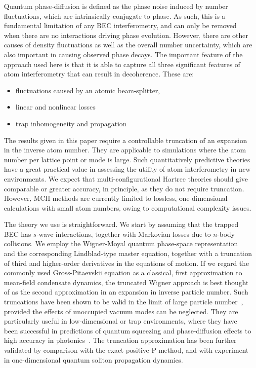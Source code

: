 \documentclass[aps,prl,twocolumn,showpacs,amsmath,amssymb,superscriptaddress]{revtex4-1}
\begin{document}
Quantum phase-diffusion is defined as the phase noise induced by number fluctuations,
which are intrinsically conjugate to phase.
As such, this is a fundamental limitation of any BEC interferometry,
and can only be removed when there are no interactions driving phase evolution.
However, there are other causes of density fluctuations as well as the overall number uncertainty,
which are also important in causing observed phase decays.
The important feature of the approach used here is that it is able to capture
all three significant features of atom interferometry that can result in decoherence.
These are:
\begin{itemize}
\item fluctuations caused by an atomic beam-splitter,
\item linear and nonlinear losses
\item trap inhomogeneity and propagation
\end{itemize}
The results given in this paper require a controllable truncation
of an expansion in the inverse atom number.
They are applicable to simulations where the atom number per lattice point or mode is large.
Such quantitatively predictive theories have a great practical value
in assessing the utility of atom interferometry in new environments.
We expect that multi-configurational Hartree theories should give comparable or greater accuracy,
in principle, as they do not require truncation.
However, MCH methods are currently limited to lossless,
one-dimensional calculations with small atom numbers,
owing to computational complexity issues.

The theory we use is straightforward.
We start by assuming that the trapped BEC has $s$-wave interactions,
together with Markovian losses due to $n$-body collisions.
We employ the Wigner-Moyal quantum phase-space representation~\cite{Gardiner2004}
and the corresponding Lindblad-type master equation,
together with a truncation of third and higher-order derivatives in the equations of motion.
If we regard the commonly used Gross-Pitaevskii equation as a classical,
first approximation to mean-field condensate dynamics,
the truncated Wigner approach is best thought of as the second approximation
in an expansion in inverse particle number.
Such truncations have been shown to be valid in the limit of large particle number~\cite{Drummond1993,Steel1998,Sinatra2002},
provided the effects of unoccupied vacuum modes can be neglected.
They are particularly useful in low-dimensional or trap environments,
where they have been successful in predictions of quantum squeezing
and phase-diffusion effects to high accuracy in photonics~\cite{Corney2008}.
The truncation approximation has been further validated by comparison
with the exact positive-P method,
and with experiment in one-dimensional quantum soliton propagation dynamics.
\end{document}
